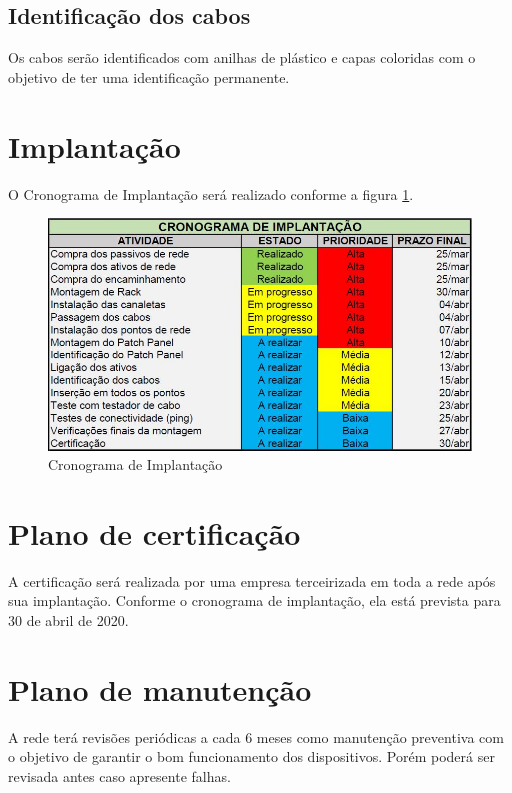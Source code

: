 \documentclass[	DIV=calc,%
							paper=a4,%
							fontsize=12pt,%
							onecolumn]{scrartcl}	 					%
\begin{document}


\subsection{Identificação dos cabos}

Os cabos serão identificados com anilhas de plástico e capas coloridas com o objetivo de ter uma identificação permanente.

\section{Implantação}

O Cronograma de Implantação será realizado conforme a figura \ref{cronograma}.

\begin{figure}
	\centering
	\includegraphics[width=\textwidth]{cronograma}
	\caption{Cronograma de Implantação}
	\label{cronograma}
\end{figure}

\section{Plano de certificação}

A certificação será realizada por uma empresa terceirizada em toda a rede após sua implantação. Conforme o cronograma de implantação, ela está prevista para 30 de abril de 2020.

\section{Plano de manutenção}

A rede terá revisões periódicas a cada 6 meses como manutenção preventiva com o objetivo de garantir o bom funcionamento dos dispositivos. Porém poderá ser revisada antes caso apresente falhas.
\end{document}
